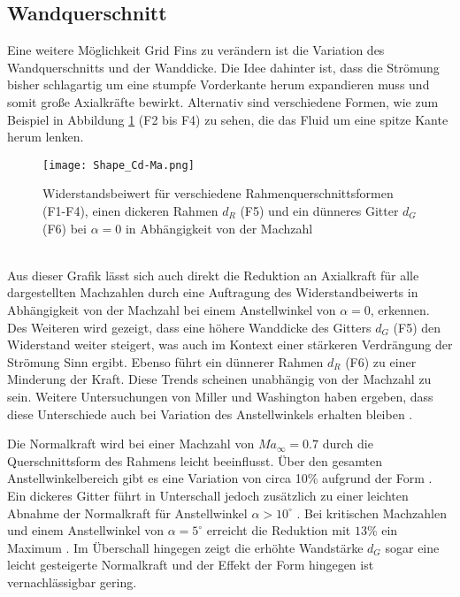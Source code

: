 \subsection{Wandquerschnitt}\label{sec_wandquerschnitt}
Eine weitere Möglichkeit Grid Fins zu verändern ist die Variation des Wandquerschnitts und der Wanddicke. Die Idee dahinter ist, dass die Strömung bisher schlagartig um eine stumpfe Vorderkante herum expandieren muss und somit große Axialkräfte bewirkt. Alternativ sind verschiedene Formen, wie zum Beispiel in Abbildung \ref{abb_Shape_Cd} (F2 bis F4) zu sehen, die das Fluid um eine spitze Kante herum lenken.
\begin{figure}[h]
	\centering
	\texttt{[image: Shape\_Cd-Ma.png]}
	\begin{flushright}
	\end{flushright}
	\caption{Widerstandsbeiwert für verschiedene Rahmenquerschnittsformen (F1-F4), einen dickeren Rahmen $d_R$ (F5) und ein dünneres Gitter $d_G$ (F6) bei $\alpha = 0$ in Abhängigkeit von der Machzahl}
	\label{abb_Shape_Cd}
\end{figure}\\
Aus dieser Grafik lässt sich auch direkt die Reduktion an Axialkraft für alle dargestellten Machzahlen durch eine Auftragung des Widerstandbeiwerts in Abhängigkeit von der Machzahl bei einem Anstellwinkel von $\alpha=0$, erkennen. Des Weiteren wird gezeigt, dass eine höhere Wanddicke des Gitters $d_G$ (F5) den Widerstand weiter steigert, was auch im Kontext einer stärkeren Verdrängung der Strömung Sinn ergibt. Ebenso führt ein dünnerer Rahmen $d_R$ (F6) zu einer Minderung der Kraft. Diese Trends scheinen unabhängig von der Machzahl zu sein. Weitere Untersuchungen von Miller und Washington haben ergeben, dass diese Unterschiede auch bei Variation des Anstellwinkels erhalten bleiben \cite{Shape}.

Die Normalkraft wird bei einer Machzahl von $Ma_\infty=0.7$ durch die Querschnittsform des Rahmens leicht beeinflusst. Über den gesamten Anstellwinkelbereich gibt es eine Variation von circa 10\% aufgrund der Form \cite{zellform}. Ein dickeres Gitter führt in Unterschall jedoch zusätzlich zu einer leichten Abnahme der Normalkraft für Anstellwinkel $\alpha>10^\circ$ \cite{zellform}. Bei kritischen Machzahlen und einem Anstellwinkel von $\alpha=5^\circ$ erreicht die Reduktion mit $13\%$ ein Maximum \cite{zellform}. Im Überschall hingegen zeigt die erhöhte Wandstärke $d_G$ sogar eine leicht gesteigerte Normalkraft und der Effekt der Form hingegen ist vernachlässigbar gering.

